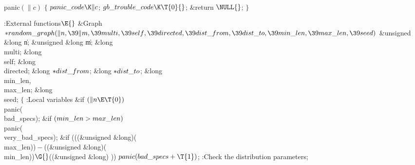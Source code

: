 \Y\B\4\D\\{panic}$(\|c)$\5
${}\{{}$\5
\1${}\\{panic\_code}\K\|c{}$;\5
${}\\{gb\_trouble\_code}\K\T{0}{}$;\5
\&{return} ${}\NULL{}$;\5
${}\}{}$\2\par
\Y\B\4:External functions\X${}\E{}$\6
\1\1\&{Graph} ${}{*}\\{random\_graph}(\|n,\39\|m,\39\\{multi},\39\\{self},\39%
\\{directed},\39\\{dist\_from},\39\\{dist\_to},\39\\{min\_len},\39\\{max\_len},%
\39\\{seed}){}$\6
\&{unsigned} \&{long} \|n;\6
\&{unsigned} \&{long} \|m;\6
\&{long} \\{multi};\6
\&{long} \\{self};\6
\&{long} \\{directed};\6
\&{long} ${}{*}\\{dist\_from}{}$;\6
\&{long} ${}{*}\\{dist\_to}{}$;\6
\&{long} \\{min\_len}${},{}$ \\{max\_len};\6
\&{long} \\{seed};\2\2\6
${}\{{}$\5
\1:Local variables\X\7
\&{if} ${}(\|n\E\T{0}){}$\1\5
\\{panic}(\\{bad\_specs});\2\6
\&{if} ${}(\\{min\_len}>\\{max\_len}){}$\1\5
\\{panic}(\\{very\_bad\_specs});\2\6
\&{if} (((\&{unsigned} \&{long})(\\{max\_len}))${}-{}$((\&{unsigned} \&{long})(%
\\{min\_len}))${}\G{}$((\&{unsigned} \&{long}) ))\1\5
${}\\{panic}(\\{bad\_specs}+\T{1}){}$;\2\6
:Check the distribution parameters\X;\6
